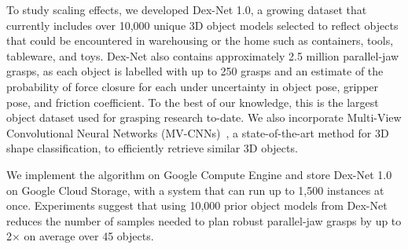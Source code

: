 To study scaling effects, we developed Dex-Net 1.0, a growing dataset that currently includes over 10,000 unique 3D object models selected to reflect objects that could be encountered in warehousing or the home such as containers, tools, tableware, and toys.
Dex-Net also contains approximately 2.5 million parallel-jaw grasps, as each object is labelled with up to 250 grasps and an estimate of the probability of force closure for each under uncertainty in object pose, gripper pose, and friction coefficient.
To the best of our knowledge, this is the largest object dataset used for grasping research to-date.
We also incorporate Multi-View Convolutional Neural Networks (MV-CNNs)~\cite{su2015multi}, a state-of-the-art method for 3D shape classification, to efficiently retrieve similar 3D objects. 

We implement the algorithm on Google Compute Engine and store Dex-Net 1.0 on Google Cloud Storage, with a system that can run up to 1,500 instances at once.
Experiments suggest that using 10,000 prior object models from Dex-Net reduces the number of samples needed to plan robust parallel-jaw grasps by up to 2$\times$ on average over 45 objects.

 





